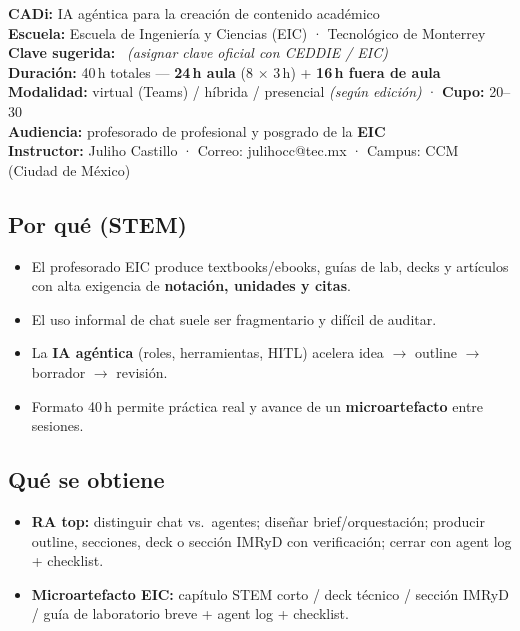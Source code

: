 
\noindent\textbf{CADi:} IA agéntica para la creación de contenido académico\\
\textbf{Escuela:} Escuela de Ingeniería y Ciencias (EIC) · Tecnológico de Monterrey\\
\textbf{Clave sugerida:} \clave\ \textit{(asignar clave oficial con CEDDIE / EIC)}\\
\textbf{Duración:} 40\,h totales --- \textbf{24\,h aula} (8 $\times$ 3\,h) + \textbf{16\,h fuera de aula}\\
\textbf{Modalidad:} virtual (Teams) / híbrida / presencial \textit{(según edición)} · \textbf{Cupo:} 20--30\\
\textbf{Audiencia:} profesorado de profesional y posgrado de la \textbf{EIC}\\
\textbf{Instructor:} Juliho Castillo · Correo: julihocc@tec.mx · Campus: CCM (Ciudad de México)

\subsection*{Por qué (STEM)}
\begin{itemize}
\item El profesorado EIC produce textbooks/ebooks, guías de lab, decks y artículos con alta exigencia de \textbf{notación, unidades y citas}.
\item El uso informal de chat suele ser fragmentario y difícil de auditar.
\item La \textbf{IA agéntica} (roles, herramientas, HITL) acelera idea $\rightarrow$ outline $\rightarrow$ borrador $\rightarrow$ revisión.
\item Formato 40\,h permite práctica real y avance de un \textbf{microartefacto} entre sesiones.
\end{itemize}

\subsection*{Qué se obtiene}
\begin{itemize}
\item \textbf{RA top:} distinguir chat vs.\ agentes; diseñar brief/orquestación; producir outline, secciones, deck o sección IMRyD con verificación; cerrar con agent log + checklist.
\item \textbf{Microartefacto EIC:} capítulo STEM corto / deck técnico / sección IMRyD / guía de laboratorio breve + agent log + checklist.
\end{itemize}

